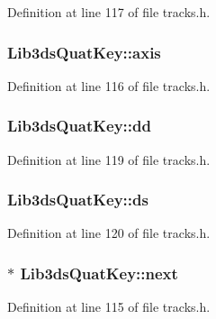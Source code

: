 Definition at line 117 of file tracks.\-h.

\hypertarget{struct_lib3ds_quat_key_a8aeb79f1e1ec38db116e100defe3c0e0}{
\subsubsection[{axis}]{ Lib3ds\-Quat\-Key\-::axis}}\label{struct_lib3ds_quat_key_a8aeb79f1e1ec38db116e100defe3c0e0}


Definition at line 116 of file tracks.\-h.

\hypertarget{struct_lib3ds_quat_key_a0e0d0109419c7fe7bd4235419e1444fc}{
\subsubsection[{dd}]{ Lib3ds\-Quat\-Key\-::dd}}\label{struct_lib3ds_quat_key_a0e0d0109419c7fe7bd4235419e1444fc}


Definition at line 119 of file tracks.\-h.

\hypertarget{struct_lib3ds_quat_key_a6641207a7a9d915611f872be6457cf54}{
\subsubsection[{ds}]{ Lib3ds\-Quat\-Key\-::ds}}\label{struct_lib3ds_quat_key_a6641207a7a9d915611f872be6457cf54}


Definition at line 120 of file tracks.\-h.

\hypertarget{struct_lib3ds_quat_key_a04b957a9e5ba279aea5655c137544187}{
\subsubsection[{next}]{$\ast$ Lib3ds\-Quat\-Key\-::next}}\label{struct_lib3ds_quat_key_a04b957a9e5ba279aea5655c137544187}


Definition at line 115 of file tracks.\-h.

